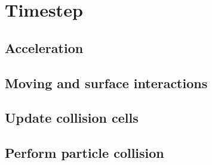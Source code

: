 \section{Timestep}
\label{sec:dsmc_implementation_timestep}

\subsection{Acceleration}
\subsection{Moving and surface interactions}
\subsection{Update collision cells}
\subsection{Perform particle collision}